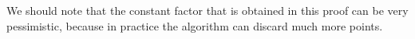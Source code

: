 \documentclass[a4paper,USenglish]{socg-lipics-v2018}
\begin{document}
We should note that the constant factor that is obtained in this proof can be very pessimistic,
because in practice the algorithm can discard much more points.

\end{document}
